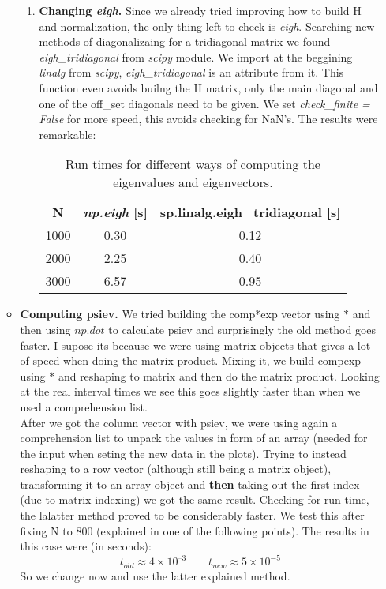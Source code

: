 \documentclass{article}
\begin{document}
\begin{itemize}
\begin{itemize}
\begin{enumerate}
			\item \textbf{Changing \textit{eigh}.} Since we already tried improving how to build H and normalization, the only thing left to check is \textit{eigh}. Searching new methods of diagonalizaing for a tridiagonal matrix we found \textit{eigh\_tridiagonal} from \textit{scipy} module. We import at the beggining \textit{linalg} from \textit{scipy}, \textit{eigh\_tridiagonal} is an attribute from it. This function even avoids builng the H matrix, only the main diagonal and one of the off\_set diagonals need to be given. We set \textit{check\_finite = False} for more speed, this avoids checking for NaN's. The results were remarkable:
			\begin{table}[H]
				\centering
				\begin{tabular}{c|c|c} 
					\textbf{N} & \textbf{\textit{np.eigh} [s]} & \textbf{sp.linalg.eigh\_tridiagonal [s]}\\
					1000 & 0.30 & 0.12 \\
					2000 & 2.25 & 0.40 \\
					3000 & 6.57 & 0.95 \\
				\end{tabular}
				\captionsetup{justification = centering, width = .8\textwidth}
				\caption{Run times for different ways of computing the eigenvalues and eigenvectors.}
			\end{table}
		\end{enumerate}
		
		\item \textbf{Computing psiev.} We tried building the comp*exp vector using $*$ and then using $np.dot$ to calculate psiev and surprisingly the old method goes faster. I supose its because we were using matrix objects that gives a lot of speed when doing the matrix product. Mixing it, we build compexp using $*$ and reshaping to matrix and then do the matrix product. Looking at the real interval times we see this goes slightly faster than when we used a comprehension list.\\
		After we got the column vector with psiev, we were using again a comprehension list to unpack the values in form of an array (needed for the input when seting the new data in the plots). Trying to instead reshaping to a row vector (although still being a matrix object), transforming it to an array object and \textbf{then} taking out the first index (due to matrix indexing) we got the same result. Checking for run time, the lalatter method proved to be considerably faster. We test this after fixing N to 800 (explained in one of the following points). The results in this case were (in seconds): 
		\[
		t_{old} \approx 4 \times 10^{–3}  \qquad t_{new} \approx 5 \times 10^{-5}
		\]
		So we change now and use the latter explained method.


\end{itemize}
\end{itemize}
\end{document}
